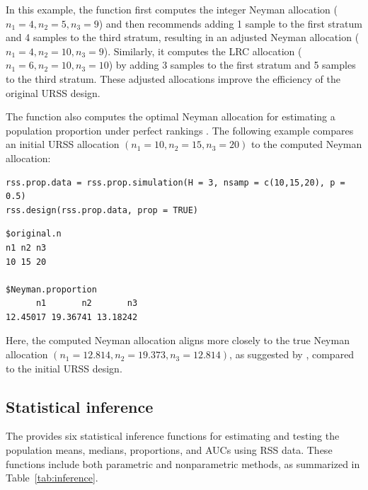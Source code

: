 %
In this example, the function first computes the integer Neyman allocation ($n_1=4, n_2=5, n_3=9$) and then recommends adding 1 sample to the first stratum and 4 samples to the third stratum, resulting in an adjusted Neyman allocation ($n_1=4, n_2=10, n_3=9$). Similarly, it computes the LRC allocation ($n_1=6, n_2=10, n_3=10$) by adding 3 samples to the first stratum and 5 samples to the third stratum. These adjusted allocations improve the efficiency of the original URSS design.

The  function also computes the optimal Neyman allocation for estimating a population proportion under perfect rankings \citep{chen2006unbalanced}. The following example compares an initial URSS allocation $(n_1=10,n_2=15,n_3=20)$ to the computed Neyman allocation:
%

\begin{verbatim}
rss.prop.data = rss.prop.simulation(H = 3, nsamp = c(10,15,20), p = 0.5)
rss.design(rss.prop.data, prop = TRUE)
\end{verbatim}
\begin{verbatim}
$original.n
n1 n2 n3 
10 15 20 

$Neyman.proportion
      n1       n2       n3 
12.45017 19.36741 13.18242 
\end{verbatim}

%
Here, the computed Neyman allocation aligns more closely to the true Neyman allocation $(n_1=12.814, n_2=19.373, n_3=12.814)$, as suggested by \cite{chen2006unbalanced}, compared to the initial URSS design.

\subsection{Statistical inference}

The  provides six statistical inference functions for estimating and testing the population means, medians, proportions, and AUCs using RSS data. These functions include both parametric and nonparametric methods, as summarized in Table~\ref{tab:inference}.

